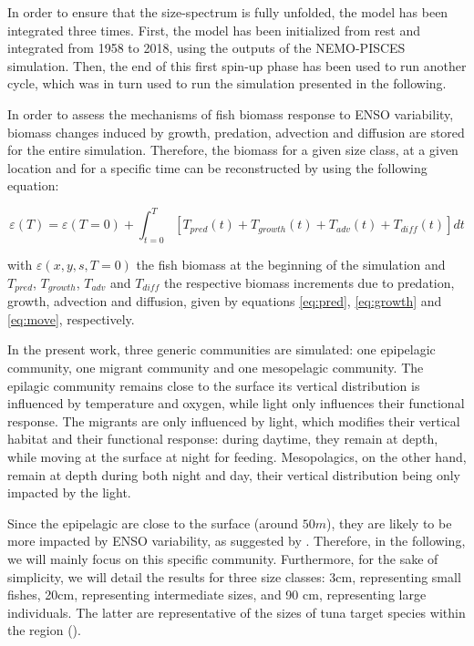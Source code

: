 In order to ensure that the size-spectrum is fully unfolded, the model has been integrated three times. First, the model has been initialized from rest and integrated from 1958 to 2018, using the outputs of the NEMO-PISCES simulation. Then, the end of this first spin-up phase has been used to run another cycle, which was in turn used to run the simulation presented in the following.

In order to assess the mechanisms of fish biomass response to ENSO variability, biomass changes induced by growth, predation, advection and diffusion are stored for the entire simulation. Therefore, the biomass for a given size class, at a given location and for a specific time can be reconstructed by using the following equation:

\begin{equation}
\varepsilon(T) = \varepsilon(T=0) + \int_{t=0}^{T} \left[ 
T_{pred}(t) +
T_{growth}(t) + 
T_{adv}(t) + 
T_{diff}(t) 
\right] dt 
\label{eq:rec_oope}
\end{equation}

with $\varepsilon(x,y,s,T=0)$ the fish biomass at the beginning of the simulation and $T_{pred}$, $T_{growth}$, $T_{adv}$ and $T_{diff}$ the respective biomass increments due to predation, growth, advection and diffusion, given by equations \ref{eq:pred}, \ref{eq:growth} and \ref{eq:move}, respectively.

In the present work, three generic communities are simulated: one epipelagic community, one migrant community and one mesopelagic community. The epilagic community remains close to the surface its vertical distribution is influenced by temperature and oxygen, while light only influences their functional response. The migrants are only influenced by light, which modifies their vertical habitat and their functional response: during daytime, they remain at depth, while moving at the surface at night for feeding. Mesopolagics, on the other hand, remain at depth during both night and day, their vertical distribution being only impacted by the light. 

Since the epipelagic are close to the surface (around $50m$), they are likely to be more impacted by ENSO variability, as suggested by \cite{lemezoNaturalVariabilityMarine2016}. Therefore, in the following, we will mainly focus on this specific community. Furthermore, for the sake of simplicity, we will detail the results for three size classes: 3cm, representing small fishes, 20cm, representing intermediate sizes, and 90 cm, representing large individuals. The latter are representative of the sizes of tuna target species within the region (). \\

